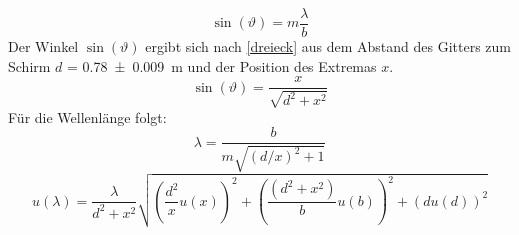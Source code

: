\documentclass[
	a4paper,
	12pt,
	pagesize,
	ngerman
]{scrartcl}
\begin{document}
	\begin{equation}
		\sin(\vartheta) = m \frac{\lambda}{b}
		\label{einzelminmax}
	\end{equation}
	Der Winkel $\sin(\vartheta)$ ergibt sich nach \cref{dreieck} aus dem Abstand des Gitters zum Schirm $d$ = \SI{0,78 +- 0,009}{m} und der Position des Extremas $x$. 
	\begin{equation}
		\sin(\vartheta) = \frac{x}{\sqrt{d^2 + x^2}}
		\label{dreieck}
	\end{equation}
	Für die Wellenlänge folgt:
	\begin{equation}
		\lambda = \frac{b}{m\sqrt{(d/x)^2 + 1}}
	\end{equation}
	\begin{equation}
	u(\lambda) = \frac{\lambda}{d^2+x^2} \sqrt{\left( \frac{d^2}{x} u(x)\right)^2 + \left( \frac{(d^2+ x^2)}{b}u(b) \right) ^2 + \left( du(d) \right)^2}
	\end{equation}
	
\end{document}
